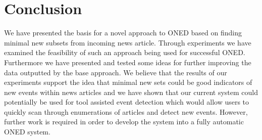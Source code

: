 \chapter{Conclusion}
\label{chapter:conclusion}
We have presented the basis for a novel approach to ONED based on finding minimal new subsets from incoming news article. Through experiments we have examined the feasibility of such an approach being used for successful ONED. Furthermore we have presented and tested some ideas for further improving the data outputted by the base approach. We believe that the results of our experiments support the idea that minimal new sets could be good indicators of new events within news articles and we have shown that our current system could potentially be used for tool assisted event detection which would allow users to quickly scan through enumerations of articles and detect new events. However, further work is required in order to develop the system into a fully automatic ONED system.
